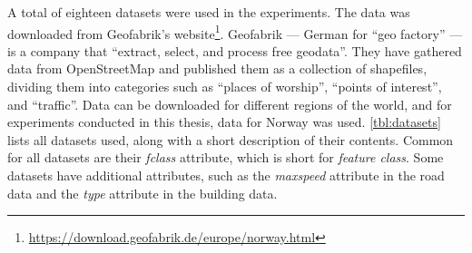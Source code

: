 \begin{comment}
        \midrule
        Outdoor Recreation Areas                  & The purpose of the dataset is to provide an overview of areas that are important for the public's outdoor life, and it should be easy to account for which assessments and criteria have been the basis for the work and the final product.                                                       \\
        \midrule
        Cultural Monuments - Protected Buildings  & Buildings and churches that are automatically, decision, regulation, or temporarily protected under law and churches that have the status as listed.                                                                                                                                              \\
        \midrule
        Flood Zones                               & Flood zones show areas that are flooded by different flood sizes (recurrence interval). Flood zones are prepared for 20-, 200-, and 1000-year floods.                                                                                                                                             \\
        \midrule
        Quick Clay Zones                          & Provides an overview of zones with potential danger (precautionary areas) for major quick clay landslides.                                                                                                                                                                                        \\
        \bottomrule
    \end{tabularx}
\end{table}

\end{comment}

A total of eighteen datasets were used in the experiments. The data was downloaded from Geofabrik's website\footnote{\url{https://download.geofabrik.de/europe/norway.html}}. Geofabrik --- German for \enquote{geo factory} --- is a company that \enquote{extract, select, and process free geodata}. They have gathered data from OpenStreetMap and published them as a collection of shapefiles, dividing them into categories such as \enquote{places of worship}, \enquote{points of interest}, and \enquote{traffic}. Data can be downloaded for different regions of the world, and for experiments conducted in this thesis, data for Norway was used. \autoref{tbl:datasets} lists all datasets used, along with a short description of their contents. Common for all datasets are their \emph{fclass} attribute, which is short for \emph{feature class}. Some datasets have additional attributes, such as the \emph{maxspeed} attribute in the road data and the \emph{type} attribute in the building data.



